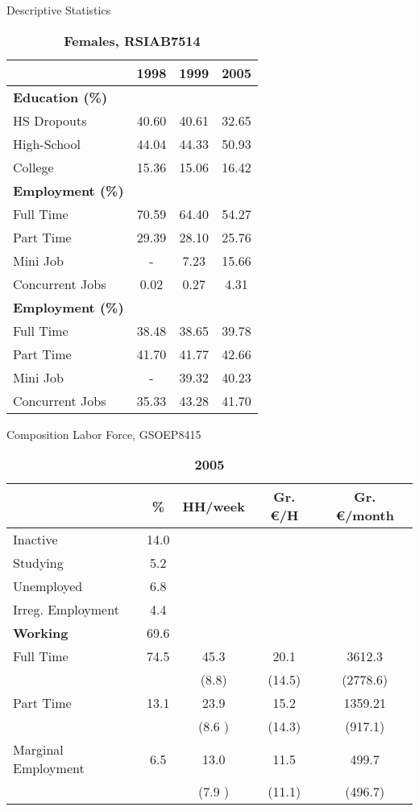 \documentclass{beamer}
\begin{document}
\begin{frame}{Descriptive Statistics}
\begin{table}[htbp]
\centering
\caption{\label{} 
\textbf{Females, RSIAB7514} }
\begin{tabular} {@{} l c c c @{}} \\ \hline
\textbf{} & \textbf{1998} & \textbf{1999} & \textbf{2005} \\
\hline
\textbf{Education (\%)}   \\
HS Dropouts & 40.60&40.61 &32.65  \\
High-School & 44.04 &44.33&50.93 \\
College 	& 15.36 & 15.06&16.42 \\
\hline
\textbf{Employment (\%)}   \\
Full Time & 70.59 &64.40&54.27  \\
Part Time & 29.39  &28.10 &25.76 \\
Mini Job  & - &7.23  &15.66 \\
Concurrent Jobs  & 0.02  &0.27 &4.31 \\
\hline
\textbf{Employment (\%)}   \\
Full Time & 38.48 &38.65&39.78  \\
Part Time & 41.70  &41.77 &42.66 \\
Mini Job  & - &39.32  &40.23 \\
Concurrent Jobs  & 35.33  &43.28 &41.70 \\
\hline
\end{tabular}
\end{table}

\end{frame}

\begin{frame}{Composition Labor Force, GSOEP8415}
\begin{table}[htbp]
\centering
\caption{\label{} 
\textbf{2005} }
\begin{tabular} {@{} l c c c c @{}} \\ \hline
\textbf{} & \textbf{\%} & \textbf{HH/week} & \textbf{Gr. \euro/H} & \textbf{Gr. \euro/month} \\
\hline
Inactive & 14.0 \\
Studying & 5.2\\
Unemployed 	& 6.8\\
Irreg. Employment 	& 4.4\\
\textbf{Working} & 69.6 \\
\hline
Full Time & 74.5 & 45.3& 20.1 & 3612.3\\
 &  & (8.8)& (14.5) &(2778.6)\\
Part Time & 13.1  &23.9 & 15.2 & 1359.21\\
 &  &(8.6 ) &(14.3) &(917.1)\\
Marginal Employment  & 6.5  & 13.0& 11.5 & 499.7\\
 &  & (7.9 ) &(11.1) & (496.7)\\
\hline
\end{tabular}
\end{table}
\end{frame}
\end{document}
